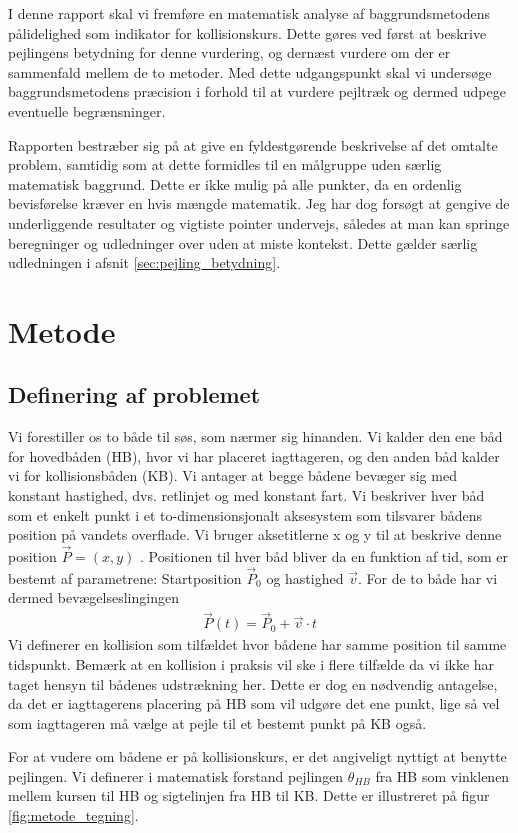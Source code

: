 \documentclass[%
 reprint,
nofootinbib,
aps,
]{revtex4-1}
\begin{document}
I denne rapport skal vi fremføre en matematisk analyse af baggrundsmetodens pålidelighed som indikator for kollisionskurs. Dette gøres ved først at beskrive pejlingens betydning for denne vurdering, og dernæst vurdere om der er sammenfald mellem de to metoder. Med dette udgangspunkt skal vi undersøge baggrundsmetodens præcision i forhold til at vurdere pejltræk og dermed udpege eventuelle begrænsninger.\par
Rapporten bestræber sig på at give en fyldestgørende beskrivelse af det omtalte problem, samtidig som at dette formidles til en målgruppe uden særlig matematisk baggrund. Dette er ikke mulig på alle punkter, da en ordenlig bevisførelse kræver en hvis mængde matematik. Jeg har dog forsøgt at gengive de underliggende resultater og vigtiste pointer undervejs, således at man kan springe beregninger og udledninger over uden at miste kontekst. Dette gælder særlig udledningen i afsnit \ref{sec:pejling_betydning}.


\section{Metode}
\subsection{Definering af problemet}
Vi forestiller os to både til søs, som nærmer sig hinanden. Vi kalder den ene båd for hovedbåden (HB), hvor vi har placeret iagttageren, og den anden båd kalder vi for kollisionsbåden (KB). Vi antager at begge bådene bevæger sig med konstant hastighed, dvs. retlinjet og med konstant fart. Vi beskriver hver båd som et enkelt punkt i et to-dimensionsjonalt aksesystem som tilsvarer bådens position på vandets overflade. Vi bruger aksetitlerne x og y til at beskrive denne position $\vec{P} = (x, y)$ . Positionen til hver båd bliver da en funktion af tid, som er bestemt af parametrene: Startposition $\vec{P}_0$ og hastighed $\vec{v}$. For de to både har vi dermed bevægelseslingingen
\begin{align}
  \vec{P}(t) =  \vec{P}_0 + \vec{v}\cdot t
  \label{eq:motion}
\end{align}
Vi definerer en kollision som tilfældet hvor bådene har samme position til samme tidspunkt. Bemærk at en kollision i praksis vil ske i flere tilfælde da vi ikke har taget hensyn til bådenes udstrækning her. Dette er dog en nødvendig antagelse, da det er iagttagerens placering på HB som vil udgøre det ene punkt, lige så vel som iagttageren må vælge at pejle til et bestemt punkt på KB også. \par
For at vudere om bådene er på kollisionskurs, er det angiveligt nyttigt at benytte pejlingen. Vi definerer i matematisk forstand pejlingen $\theta_{HB}$ fra HB som vinklenen mellem kursen til HB og sigtelinjen fra HB til KB. Dette er illustreret på figur \ref{fig:metode_tegning}.
\end{document}
